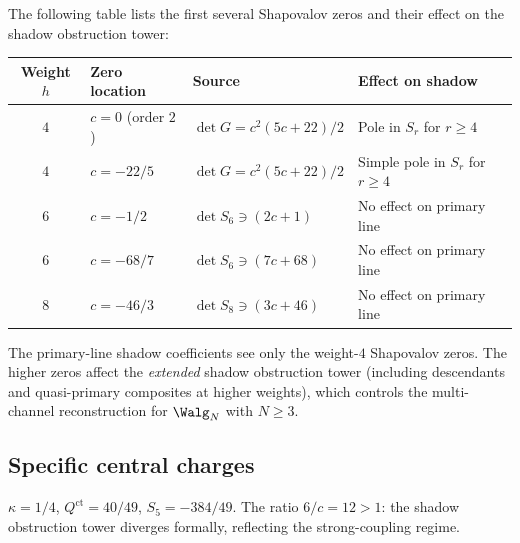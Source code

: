 \begin{computation}
\label{comp:shapovalov-zeros-shadow}
The following table lists the first several Shapovalov
zeros and their effect on the shadow obstruction tower:

\begin{center}
\renewcommand{\arraystretch}{1.4}
\begin{tabular}{clll}
\toprule
Weight $h$ & Zero location & Source & Effect on shadow \\
\midrule
$4$ & $c = 0$ (order $2$) & $\det G = c^2(5c+22)/2$
 & Pole in $S_r$ for $r \geq 4$ \\
$4$ & $c = -22/5$ & $\det G = c^2(5c+22)/2$
 & Simple pole in $S_r$ for $r \geq 4$ \\
$6$ & $c = -1/2$ & $\det S_6 \ni (2c+1)$
 & No effect on primary line \\
$6$ & $c = -68/7$ & $\det S_6 \ni (7c+68)$
 & No effect on primary line \\
$8$ & $c = -46/3$ & $\det S_8 \ni (3c+46)$
 & No effect on primary line \\
\bottomrule
\end{tabular}
\end{center}

\noindent The primary-line shadow coefficients see only
the weight-$4$ Shapovalov zeros. The higher zeros
affect the \emph{extended} shadow obstruction tower (including
descendants and quasi-primary composites at higher
weights), which controls the multi-channel reconstruction
for $\Walg_N$ with $N \geq 3$.
\end{computation}


\subsection{Specific central charges}
\label{subsec:specific-central-charges}

\begin{example}[Ising model, $c = 1/2$]
\label{ex:ising-shadow}
$\kappa = 1/4$, $Q^{\mathrm{ct}} = 40/49$,
$S_5 = -384/49$.
The ratio $6/c = 12 > 1$: the shadow obstruction tower diverges
formally, reflecting the strong-coupling regime.
\end{example}


